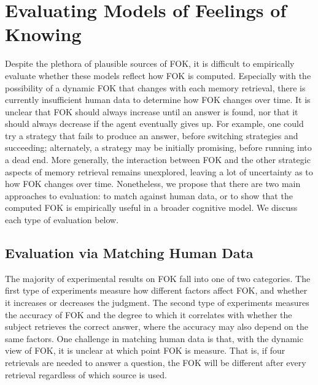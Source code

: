 \documentclass[10pt,letterpaper]{article}
\newcommand{\fixme}[2][]{#2}
\renewcommand{\fixme}[2][]{\textcolor{red}{#2}}
\begin{document}

\section{Evaluating Models of Feelings of Knowing}


Despite the plethora of plausible sources of FOK, it is difficult to empirically evaluate whether these models reflect how FOK is computed.
Especially with the possibility of a dynamic FOK that changes with each memory retrieval, there is currently insufficient human data to determine how FOK changes over time.
It is unclear that FOK should always increase until an answer is found, nor that it should always decrease if the agent eventually gives up.
For example, one could try a strategy that fails to produce an answer, before switching strategies and succeeding; alternately, a strategy may be initially promising, before running into a dead end.
More generally, the interaction between FOK and the other strategic aspects of memory retrieval remains unexplored, leaving a lot of uncertainty as to how FOK changes over time.
Nonetheless, we propose that there are two main approaches to evaluation: to match against human data, or to show that the computed FOK is empirically useful in a broader cognitive model.
We discuss each type of evaluation below.

\subsection{Evaluation via Matching Human Data}

The majority of experimental results on FOK fall into one of two categories.
The first type of experiments measure how different factors affect FOK, and whether it increases or decreases the judgment. %
The second type of experiments measures the accuracy of FOK and the degree to which it correlates with whether the subject retrieves the correct answer, where the accuracy may also depend on the same factors. %
One challenge in matching human data is that, with the dynamic view of FOK, it is unclear at which point FOK is measure.
That is, if four retrievals are needed to answer a question, the FOK will be different after every retrieval regardless of which source is used.
\end{document}
